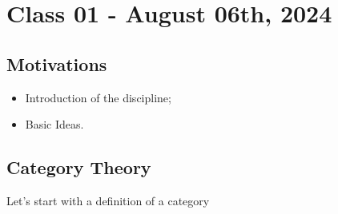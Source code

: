 \documentclass[../category_theory.tex]{subfiles}
\begin{document}
\section{Class 01 - August 06th, 2024}
\subsection{Motivations}
\begin{itemize}
	\item Introduction of the discipline;
	\item Basic Ideas.
\end{itemize}
\subsection{Category Theory}
Let's start with a definition of a category
\end{document}

